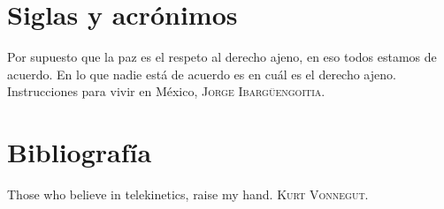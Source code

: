 \documentclass[11pt, letterpaper, twosides, draft]{book}
\begin{document}
  \renewcommand{\capitulo}[3]
  {
    \chapter*{#1}
    \label{#2}
    #3
    \newpage
  }


  \printglossary[
    type=main,
    entrycounter=true
  ]

  \capitulo{Siglas y acrónimos}{sec:siglas}
  {
    \epigrafe
    {%
      Por supuesto que la paz es el respeto al derecho ajeno, en eso todos
      estamos de acuerdo. En lo que nadie está de acuerdo es en cuál es el
      derecho ajeno.%
    }
    {%
      Instrucciones para vivir en México,
      \textsc{Jorge Ibargüengoitia}.%
    }
  }

  \renewcommand*{\glsgroupskip}{}

  \printglossary[
    type=siglas_cripto,
    title={Criptográficos}
  ]

  \printglossary[
    type=siglas_computacionales,
    title={Computacionales}
  ]

  \printglossary[
    type=siglas_bancarias,
    title={Bancarios}
  ]

  \printglossary[
    type=siglas_instituciones,
    title={De instituciones y asociaciones}
  ]


  \newpage
  \capitulo{Bibliografía}{sec:referencias}
  {
    \epigrafe
    {%
      Those who believe in telekinetics, raise my hand.%
    }
    {%
      \textsc{Kurt Vonnegut}.%
    }
  }
  \printbibliography[
    heading=none,
    title={Bibliografía}
  ]

  \newpage
  \listoffigures

  \newpage
  \listoftables

  \newpage
  \lstlistoflistings

\end{document}
